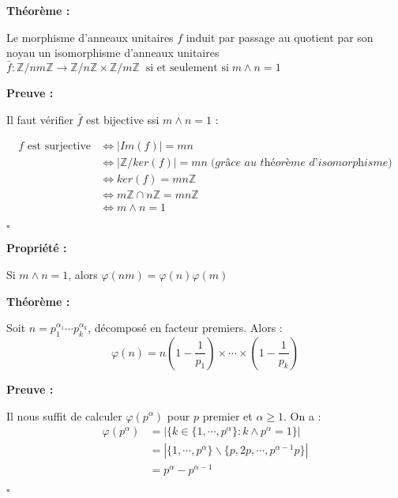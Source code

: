 \documentclass{report}
\renewenvironment{leftbar}{%
  \def\FrameCommand{\vrule width 0.4pt \hspace{10pt}}%
  \MakeFramed {\advance\hsize-\width \FrameRestore}}%
 {\endMakeFramed}%
\newenvironment{preuve}{\vspace*{0.5cm}
    \begin{leftbar}
    \noindent\textbf{Preuve :}\par}{
    \begin{flushright}
    $\square$
    \end{flushright}
    \end{leftbar}
}
\newenvironment{prop}{\begin{tcolorbox}[colframe= white]
    \textbf{Propriété :}
     \par}
    {\end{tcolorbox}}
\newenvironment{theoreme}[1][]{
    \begin{tcolorbox}[]
    \textbf{Théorème :} #1  \par} 
    {\end{tcolorbox}}
\begin{document}
\begin{theoreme}
	Le morphisme d'anneaux unitaires $f$ induit par passage au quotient par son noyau un isomorphisme d'anneaux unitaires 
	$\bar{f} : \mathbb{Z}/nm\mathbb{Z} \rightarrow \mathbb{Z}/n\mathbb{Z} \times \mathbb{Z}/m\mathbb{Z}\; \; \text{si et seulement si}\; m\wedge n =1$
\end{theoreme}

\begin{preuve}
	Il faut vérifier $\bar{f}$ est bijective ssi $m \wedge n=1$ : \par
	\begin{equation*} 
	\begin{split}
		f \text{ est surjective}  & \iff | Im(f) | =mn \\
 		& \iff |\mathbb{Z}/ker(f)| = mn \; \textit{(grâce au théorème d'isomorphisme)} \\ 
		& \iff ker(f)= mn\mathbb{Z} \\ 
		& \iff m\mathbb{Z} \cap n\mathbb{Z} = mn\mathbb{Z} \\
		& \iff m \wedge n =1
	\end{split}
\end{equation*}
\end{preuve}

\begin{prop}
	Si $m \wedge n =1$, alors $\varphi (nm) = \varphi (n) \varphi (m)$
\end{prop}

\begin{theoreme}
	Soit $n=p_1^{\alpha_1} \cdots p_k^{\alpha_k}$, décomposé en facteur premiers. Alors : $$\varphi (n) = n \left (1-\frac{1}{p_1} \right )\times \cdots  \times \left (1-\frac{1}{p_k} \right ) $$
\end{theoreme}

\begin{preuve}
Il nous suffit de calculer $\varphi (p^\alpha)$ pour $p$ premier et $\alpha \geq 1$. On a : 
\begin{equation*} \label{eq1}
	\begin{split}
	\varphi (p^\alpha) & = | \{ k \in \{1, \cdots , p^\alpha \} : k \wedge p^\alpha =1 \}|  \\
	& = | \{ 1, \cdots , p^\alpha \} \backslash \{ p, 2p, \cdots , p^{\alpha -1}p \} | \\
	& =p^{\alpha}-p^{\alpha -1}
	\end{split}
\end{equation*}
\end{preuve}
\end{document}

